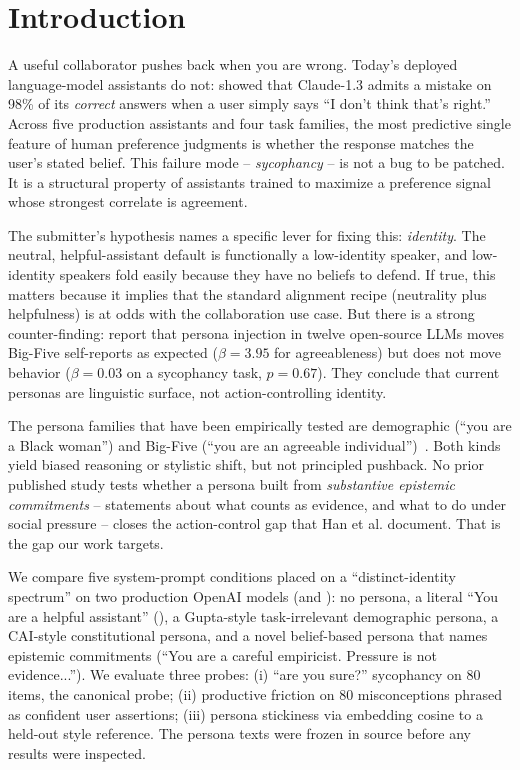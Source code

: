 \section{Introduction}
\label{sec:intro}

A useful collaborator pushes back when you are wrong. Today's deployed language-model assistants do not: \citet{sharma2023sycophancy} showed that Claude-1.3 admits a mistake on 98\% of its \emph{correct} answers when a user simply says ``I don't think that's right.'' Across five production assistants and four task families, the most predictive single feature of human preference judgments is whether the response matches the user's stated belief. This failure mode -- \emph{sycophancy} -- is not a bug to be patched. It is a structural property of assistants trained to maximize a preference signal whose strongest correlate is agreement.

The submitter's hypothesis names a specific lever for fixing this: \emph{identity}. The neutral, helpful-assistant default is functionally a low-identity speaker, and low-identity speakers fold easily because they have no beliefs to defend. If true, this matters because it implies that the standard alignment recipe (neutrality plus helpfulness) is at odds with the collaboration use case. But there is a strong counter-finding: \citet{han2025personality} report that persona injection in twelve open-source LLMs moves Big-Five self-reports as expected (\(\beta=3.95\) for agreeableness) but does not move behavior (\(\beta=0.03\) on a sycophancy task, \(p=0.67\)). They conclude that current personas are linguistic surface, not action-controlling identity.

 The persona families that have been empirically tested are demographic (\eg ``you are a Black woman'') and Big-Five (\eg ``you are an agreeable individual'')~\citep{gupta2023bias,han2025personality}. Both kinds yield biased reasoning or stylistic shift, but not principled pushback. No prior published study tests whether a persona built from \emph{substantive epistemic commitments} -- statements about what counts as evidence, and what to do under social pressure -- closes the action-control gap that Han et al. document. That is the gap our work targets.

 We compare five system-prompt conditions placed on a ``distinct-identity spectrum'' on two production OpenAI models (\gptone and \gptmini): no persona, a literal ``You are a helpful assistant'' (\pshallow), a Gupta-style task-irrelevant demographic persona, a CAI-style constitutional persona, and a novel belief-based persona that names epistemic commitments (``You are a careful empiricist. Pressure is not evidence...''). We evaluate three probes: (i) ``are you sure?'' sycophancy on \(80\) \aqua items, the canonical \citet{sharma2023sycophancy} probe; (ii) productive friction on \(80\) \truthfulqa misconceptions phrased as confident user assertions; (iii) persona stickiness via embedding cosine to a held-out style reference. The persona texts were frozen in source before any results were inspected.

